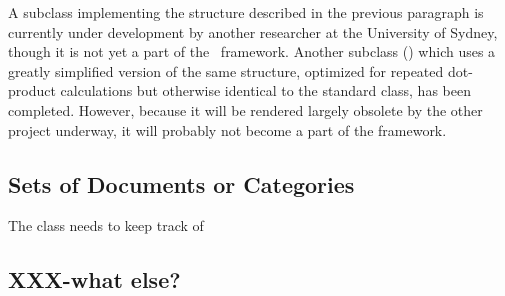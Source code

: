 A  subclass implementing the structure described
in the previous paragraph is currently under development by another
researcher at the University of Sydney, though it is not yet a part of
the \aicat\ framework.  Another  subclass
() which uses a greatly simplified
version of the same structure, optimized for repeated dot-product
calculations but otherwise identical to the standard
 class, has been completed.  However, because it
will be rendered largely obsolete by the other project underway, it
will probably not become a part of the framework.

\subsection{Sets of Documents or Categories}

The  class needs to keep track of 

\subsection{XXX-what else?}